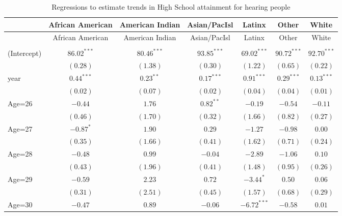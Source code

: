\documentclass[fullpage]{paper}
\begin{document}
\begin{center}
\begin{longtable}{l c c c c c c }
\hline
 & African American & American Indian & Asian/PacIsl & Latinx & Other & White \\
\hline
\endfirsthead
\hline
 & African American & American Indian & Asian/PacIsl & Latinx & Other & White \\
\hline
\endhead
\hline
\endfoot
\hline
\multicolumn{7}{l}{\scriptsize{$^{***}p<0.001$, $^{**}p<0.01$, $^*p<0.05$}}\\
\caption{Regressions to estimate trends in High School attainment for hearing people}
\label{table:coefficients}
\endlastfoot
(Intercept) & $86.02^{***}$ & $80.46^{***}$ & $93.85^{***}$  & $69.02^{***}$  & $90.72^{***}$ & $92.70^{***}$ \\
            & $(0.28)$      & $(1.38)$      & $(0.30)$       & $(1.22)$       & $(0.65)$      & $(0.22)$      \\
year        & $0.44^{***}$  & $0.23^{**}$   & $0.17^{***}$   & $0.91^{***}$   & $0.29^{***}$  & $0.13^{***}$  \\
            & $(0.02)$      & $(0.07)$      & $(0.02)$       & $(0.04)$       & $(0.04)$      & $(0.01)$      \\
Age=26      & $-0.44$       & $1.76$        & $0.82^{**}$    & $-0.19$        & $-0.54$       & $-0.11$       \\
            & $(0.46)$      & $(1.70)$      & $(0.32)$       & $(1.66)$       & $(0.82)$      & $(0.27)$      \\
Age=27      & $-0.87^{*}$   & $1.90$        & $0.29$         & $-1.27$        & $-0.98$       & $0.00$        \\
            & $(0.35)$      & $(1.66)$      & $(0.41)$       & $(1.62)$       & $(0.71)$      & $(0.24)$      \\
Age=28      & $-0.48$       & $0.99$        & $-0.04$        & $-2.89$        & $-1.06$       & $0.10$        \\
            & $(0.43)$      & $(1.96)$      & $(0.41)$       & $(1.48)$       & $(0.95)$      & $(0.26)$      \\
Age=29      & $-0.59$       & $2.23$        & $0.72$         & $-3.44^{*}$    & $0.50$        & $0.06$        \\
            & $(0.31)$      & $(2.51)$      & $(0.45)$       & $(1.57)$       & $(0.68)$      & $(0.29)$      \\
Age=30      & $-0.47$       & $0.89$        & $-0.06$        & $-6.72^{***}$  & $-0.58$       & $0.01$        \\

\end{longtable}
\end{center}
\end{document}
